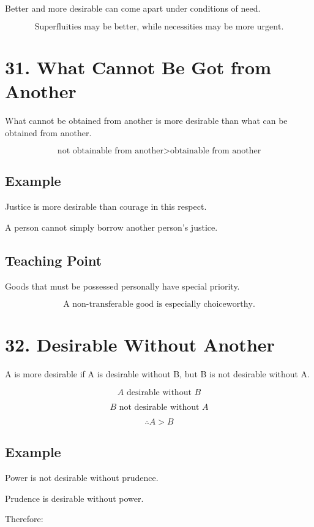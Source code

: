 \documentclass[12pt]{article}
\begin{document}
Better and more desirable can come apart under conditions of need.

\[
\boxed{
\text{Superfluities may be better, while necessities may be more urgent.}
}
\]

\section*{31. What Cannot Be Got from Another}

What cannot be obtained from another is more desirable than what can be
obtained from another.

\[
\text{not obtainable from another} > \text{obtainable from another}
\]

\subsection*{Example}

Justice is more desirable than courage in this respect.

A person cannot simply borrow another person's justice.

\subsection*{Teaching Point}

Goods that must be possessed personally have special priority.

\[
\boxed{
\text{A non-transferable good is especially choiceworthy.}
}
\]

\section*{32. Desirable Without Another}

A is more desirable if A is desirable without B, but B is not desirable without
A.

\[
A \text{ desirable without } B
\]

\[
B \text{ not desirable without } A
\]

\[
\therefore A > B
\]

\subsection*{Example}

Power is not desirable without prudence.

Prudence is desirable without power.

Therefore:
\end{document}
